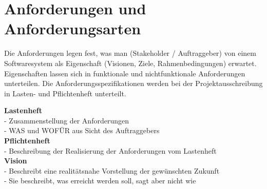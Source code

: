 \section{Anforderungen und Anforderungsarten}
Die Anforderungen legen fest, was man (Stakeholder / Auftraggeber) von einem Softwaresystem als Eigenschaft (Visionen, Ziele, Rahmenbedingungen) erwartet. Eigenschaften lassen sich in funktionale und nichtfunktionale Anforderungen unterteilen. 
Die Anforderungsspezifikationen werden bei der Projektausschreibung in Lasten- und 
Pflichtenheft unterteilt. \\
\begin{minipage}{10cm}
\end{minipage}
\begin{minipage}{7cm}
	\textbf{Lastenheft} \\
	- Zusammenstellung der Anforderungen \\
	- WAS und WOFÜR aus Sicht des Auftraggebers \\
	\textbf{Pflichtenheft} \\
	- Beschreibung der Realisierung der Anforderungen vom Lastenheft \\
	\textbf{Vision} \\
	- Beschreibt eine realitätsnahe Vorstellung der gewünschten Zukunft \\
	- Sie beschreibt, was erreicht werden soll, sagt aber nicht wie \\
\end{minipage}

